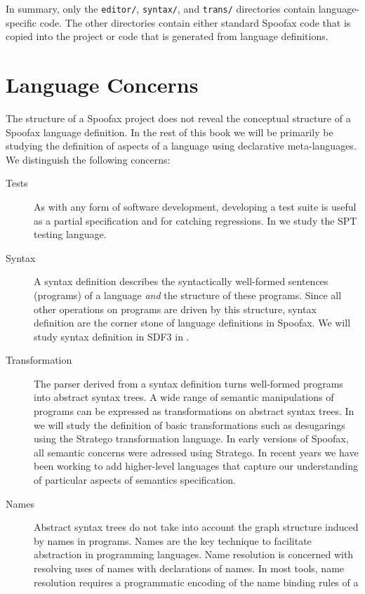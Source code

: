 In summary, only the \texttt{editor/}, \texttt{syntax/}, and \texttt{trans/}
directories contain language-specific code. 
The other directories contain either standard Spoofax code that is copied into
the project or code that is generated from language definitions.

\section{Language Concerns}

The structure of a Spoofax project does not reveal the conceptual structure of a
Spoofax language definition. In the rest of this book we will be primarily be
studying the definition of aspects of a language using declarative
meta-languages. We distinguish the following concerns:

\begin{description}
\item[Tests] As with any form of software development, developing
a test suite is useful as a partial specification and for catching regressions.
In  we study the SPT testing language.
\item[Syntax] A syntax definition describes the syntactically well-formed
sentences (programs) of a language \emph{and} the structure of these programs.
Since all other operations on programs are driven by this structure, syntax
definition are the corner stone of language definitions in Spoofax. We will
study syntax definition in SDF3 in .
\item[Transformation] The parser derived from a syntax definition turns
well-formed programs into abstract syntax trees. A wide range of semantic
manipulations of programs can be expressed as transformations on abstract syntax
trees. In  we will study the definition of basic
transformations such as desugarings using the Stratego transformation language.
In early versions of Spoofax, all semantic concerns were adressed using
Stratego. In recent years we have been working to add higher-level languages
that capture our understanding of particular aspects of semantics specification.
\item[Names] Abstract syntax trees do not take into account the graph structure
induced by names in programs. Names are the key technique to facilitate
abstraction in programming languages. Name resolution is concerned with
resolving uses of names with declarations of names. In most tools, name
resolution requires a programmatic encoding of the name binding rules of a

\end{description}
